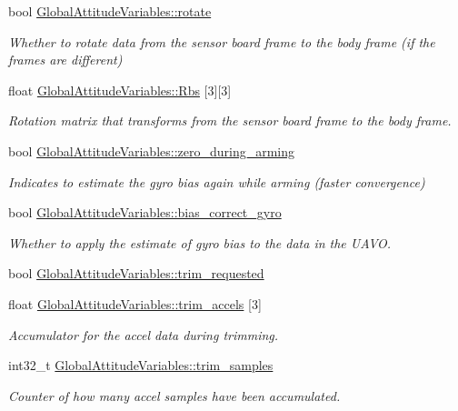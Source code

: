 \begin{DoxyCompactItemize}
bool \hyperlink{group___state_estimation_filters_gad5da7bf77c18e9d5990d4b6d6f28477e}{\-Global\-Attitude\-Variables\-::rotate}
\begin{DoxyCompactList}\small\item\em \-Whether to rotate data from the sensor board frame to the body frame (if the frames are different) \end{DoxyCompactList}\item 
float \hyperlink{group___state_estimation_filters_ga6c34048525801ac0e7e26eb733c759d5}{\-Global\-Attitude\-Variables\-::\-Rbs} \mbox{[}3\mbox{]}\mbox{[}3\mbox{]}
\begin{DoxyCompactList}\small\item\em \-Rotation matrix that transforms from the sensor board frame to the body frame. \end{DoxyCompactList}\item 
bool \hyperlink{group___state_estimation_filters_gaa625401f5bc69c19b54b3171703f37f9}{\-Global\-Attitude\-Variables\-::zero\-\_\-during\-\_\-arming}
\begin{DoxyCompactList}\small\item\em \-Indicates to estimate the gyro bias again while arming (faster convergence) \end{DoxyCompactList}\item 
bool \hyperlink{group___state_estimation_filters_ga3df4e05bd900b439ad746cbadce667d5}{\-Global\-Attitude\-Variables\-::bias\-\_\-correct\-\_\-gyro}
\begin{DoxyCompactList}\small\item\em \-Whether to apply the estimate of gyro bias to the data in the \-U\-A\-V\-O. \end{DoxyCompactList}\item 
bool \hyperlink{group___state_estimation_filters_ga1b90881e0b0eb5aa9cf39d0ba8ef5e0d}{\-Global\-Attitude\-Variables\-::trim\-\_\-requested}
\item 
float \hyperlink{group___state_estimation_filters_ga8941c16a263cb020587ef58dd38f8281}{\-Global\-Attitude\-Variables\-::trim\-\_\-accels} \mbox{[}3\mbox{]}
\begin{DoxyCompactList}\small\item\em \-Accumulator for the accel data during trimming. \end{DoxyCompactList}\item 
int32\-\_\-t \hyperlink{group___state_estimation_filters_ga9e5b2790cd84db83278b3c8c289ea411}{\-Global\-Attitude\-Variables\-::trim\-\_\-samples}
\begin{DoxyCompactList}\small\item\em \-Counter of how many accel samples have been accumulated. \end{DoxyCompactList}\item 

\end{DoxyCompactItemize}
